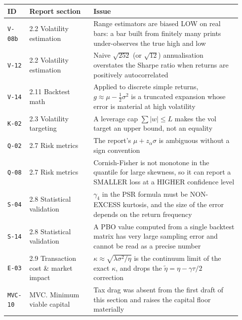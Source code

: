\begingroup\small
\begin{longtable}{@{}p{0.075\linewidth}p{0.26\linewidth}p{0.60\linewidth}@{}}
\toprule
\textbf{ID} & \textbf{Report section} & \textbf{Issue} \\
\midrule\endhead
\texttt{\small V-08b} & \small 2.2 Volatility estimation & \small Range estimators are biased LOW on real bars: a bar built from finitely many prints under-observes the true high and low \\
\texttt{\small V-12} & \small 2.2 Volatility estimation & \small Naive $\sqrt{252}$ (or $\sqrt{12}$) annualisation overstates the Sharpe ratio when returns are positively autocorrelated \\
\texttt{\small V-14} & \small 2.11 Backtest math & \small Applied to discrete simple returns, $g\approx\mu-\tfrac12\sigma^2$ is a truncated expansion whose error is material at high volatility \\
\texttt{\small K-02} & \small 2.3 Volatility targeting & \small A leverage cap $\sum|w|\le L$ makes the vol target an upper bound, not an equality \\
\texttt{\small Q-02} & \small 2.7 Risk metrics & \small The report's $\mu+z_\alpha\sigma$ is ambiguous without a sign convention \\
\texttt{\small Q-08} & \small 2.7 Risk metrics & \small Cornish-Fisher is not monotone in the quantile for large skewness, so it can report a SMALLER loss at a HIGHER confidence level \\
\texttt{\small S-04} & \small 2.8 Statistical validation & \small $\gamma_4$ in the PSR formula must be NON-EXCESS kurtosis, and the size of the error depends on the return frequency \\
\texttt{\small S-14} & \small 2.8 Statistical validation & \small A PBO value computed from a single backtest matrix has very large sampling error and cannot be read as a precise number \\
\texttt{\small E-03} & \small 2.9 Transaction cost \& market impact & \small $\kappa\approx\sqrt{\lambda\sigma^2/\eta}$ is the continuum limit of the exact $\kappa$, and drops the $\tilde\eta=\eta-\gamma\tau/2$ correction \\
\texttt{\small MVC-10} & \small MVC. Minimum viable capital & \small Tax drag was absent from the first draft of this section and raises the capital floor materially \\
\bottomrule
\end{longtable}\endgroup
